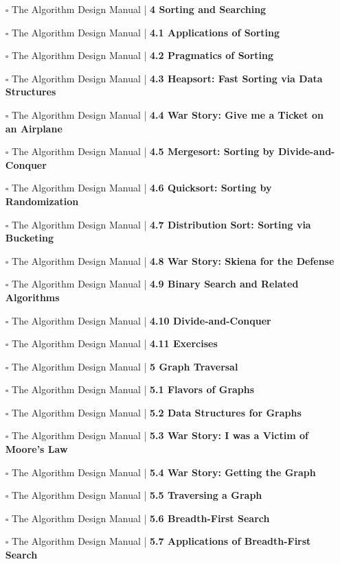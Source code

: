 \documentclass[a4, landscape, 12pt]{article}
\newcommand{\checkbox}{$\square$}%
\begin{document}
\begin{itemize}
{}
\item [\checkbox]  The Algorithm Design Manual | \textbf{ 4 Sorting and Searching
}
\item [\checkbox]  The Algorithm Design Manual | \textbf{ 4.1 Applications of Sorting
}
\item [\checkbox]  The Algorithm Design Manual | \textbf{ 4.2 Pragmatics of Sorting
}
\item [\checkbox]  The Algorithm Design Manual | \textbf{ 4.3 Heapsort: Fast Sorting via Data Structures
}
\item [\checkbox]  The Algorithm Design Manual | \textbf{ 4.4 War Story: Give me a Ticket on an Airplane
}
\item [\checkbox]  The Algorithm Design Manual | \textbf{ 4.5 Mergesort: Sorting by Divide-and-Conquer
}
\item [\checkbox]  The Algorithm Design Manual | \textbf{ 4.6 Quicksort: Sorting by Randomization
}
\item [\checkbox]  The Algorithm Design Manual | \textbf{ 4.7 Distribution Sort: Sorting via Bucketing
}
\item [\checkbox]  The Algorithm Design Manual | \textbf{ 4.8 War Story: Skiena for the Defense
}
\item [\checkbox]  The Algorithm Design Manual | \textbf{ 4.9 Binary Search and Related Algorithms
}
\item [\checkbox]  The Algorithm Design Manual | \textbf{ 4.10 Divide-and-Conquer
}
\item [\checkbox]  The Algorithm Design Manual | \textbf{ 4.11 Exercises
}
\item [\checkbox]  The Algorithm Design Manual | \textbf{ 5 Graph Traversal
}
\item [\checkbox]  The Algorithm Design Manual | \textbf{ 5.1 Flavors of Graphs
}
\item [\checkbox]  The Algorithm Design Manual | \textbf{ 5.2 Data Structures for Graphs
}
\item [\checkbox]  The Algorithm Design Manual | \textbf{ 5.3 War Story: I was a Victim of Moore’s Law
}
\item [\checkbox]  The Algorithm Design Manual | \textbf{ 5.4 War Story: Getting the Graph
}
\item [\checkbox]  The Algorithm Design Manual | \textbf{ 5.5 Traversing a Graph
}
\item [\checkbox]  The Algorithm Design Manual | \textbf{ 5.6 Breadth-First Search
}
\item [\checkbox]  The Algorithm Design Manual | \textbf{ 5.7 Applications of Breadth-First Search
}
\end{itemize}
\end{document}
